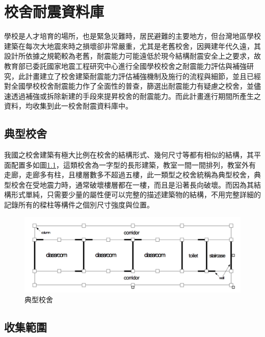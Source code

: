 \renewcommand\thetable{\arabic{chapter}-\arabic{table}}
\renewcommand{\theequation}{\arabic{chapter}-\arabic{equation}}
\chapter{校舍耐震資料庫}

學校是人才培育的場所，也是緊急災難時，居民避難的主要地方，但台灣地區學校建築在每次大地震來時之損壞卻非常嚴重，尤其是老舊校舍，因興建年代久遠，其設計所依據之規範較為老舊，耐震能力可能遠低於現今結構耐震安全上之要求，故教育部已委託國家地震工程研究中心進行全國學校校舍之耐震能力評估與補強研究，此計畫建立了校舍建築耐震能力評估補強機制及施行的流程與細節，並且已經對全國學校校舍耐震能力作了全面性的普查，篩選出耐震能力有疑慮之校舍，並儘速透過補強或拆除新建的手段來提昇校舍的耐震能力。而此計畫進行期間所產生之資料，均收集到此一校舍耐震資料庫中。

\section{典型校舍}

我國之校舍建築有極大比例在校舍的結構形式、幾何尺寸等都有相似的結構，其平面配置多如圖\ref{fig:TSB}，這類校舍為一字型的長形建築，教室一間一間排列，教室外有走廊，走廊多有柱，且樓層數多不超過五樓，此一類型之校舍統稱為典型校舍，典型校舍在受地震力時，通常破壞樓層都在一樓，而且是沿著長向破壞。而因為其結構形式單純，只需要少量的屬性便可以完整的描述建築物的結構，不用完整詳細的記錄所有的樑柱等構件之個別尺寸強度與位置。

\begin{figure}[hbtp]
  \begin{center}
    \includegraphics[width=1.0\textwidth]{figures/trad-school-buildings.png}
    \caption{典型校舍} 
    \label{fig:TSB}
  \end{center}
\end{figure}

\section{收集範圍}

